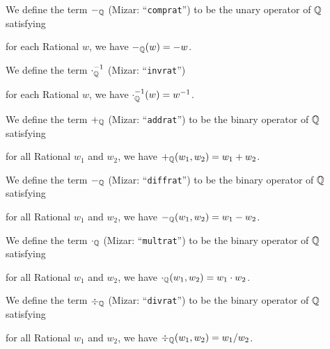 \documentclass{article}
\begin{document}
\begin{definition}
We define the term $-_{\mathbb{Q}}$ (Mizar: ``\verb#comprat#'') to be the unary
operator of $\mathbb{Q}$ satisfying
\begin{defn}
\item for each Rational $w$, we have $-_{\mathbb{Q}}(w)=-w$.
\end{defn}
We define the term $\cdot^{-1}_{\mathbb{Q}}$ (Mizar: ``\verb#invrat#'')
\begin{defn}
\item for each Rational $w$, we have $\cdot^{-1}_{\mathbb{Q}}(w)=w^{-1}$.
\end{defn}
We define the term $+_{\mathbb{Q}}$ (Mizar: ``\verb#addrat#'') to be the
binary operator of $\mathbb{Q}$ satisfying
\begin{defn}
\item for all Rational $w_{1}$ and $w_{2}$, we have $+_{\mathbb{Q}}(w_{1},w_{2})=w_{1}+w_{2}$.
\end{defn}
We define the term $-_{\mathbb{Q}}$ (Mizar: ``\verb#diffrat#'') to be the
binary operator of $\mathbb{Q}$ satisfying
\begin{defn}
\item for all Rational $w_{1}$ and $w_{2}$, we have $-_{\mathbb{Q}}(w_{1},w_{2})=w_{1}-w_{2}$.
\end{defn}
We define the term $\cdot_{\mathbb{Q}}$ (Mizar: ``\verb#multrat#'') to be
the binary operator of $\mathbb{Q}$ satisfying
\begin{defn}
\item for all Rational $w_{1}$ and $w_{2}$, we have $\cdot_{\mathbb{Q}}(w_{1},w_{2})=w_{1}\cdot w_{2}$.
\end{defn}
We define the term $\div_{\mathbb{Q}}$ (Mizar: ``\verb#divrat#'') to be
the binary operator of $\mathbb{Q}$ satisfying
\begin{defn}
\item for all Rational $w_{1}$ and $w_{2}$, we have $\div_{\mathbb{Q}}(w_{1},w_{2})=w_{1}/w_{2}$.
\end{defn}
\end{definition}
\end{document}
